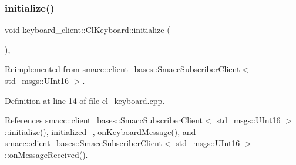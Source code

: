 \subsubsection{\texorpdfstring{initialize()}{initialize()}}
{\footnotesize\ttfamily void keyboard\+\_\+client\+::\+Cl\+Keyboard\+::initialize (\begin{DoxyParamCaption}{ }\end{DoxyParamCaption})\hspace{0.3cm}{\ttfamily [override]}, {\ttfamily [virtual]}}



Reimplemented from \hyperlink{classsmacc_1_1client__bases_1_1SmaccSubscriberClient_af188f0f5e89de26a07e1f964cdd23a70}{smacc\+::client\+\_\+bases\+::\+Smacc\+Subscriber\+Client$<$ std\+\_\+msgs\+::\+U\+Int16 $>$}.



Definition at line 14 of file cl\+\_\+keyboard.\+cpp.



References smacc\+::client\+\_\+bases\+::\+Smacc\+Subscriber\+Client$<$ std\+\_\+msgs\+::\+U\+Int16 $>$\+::initialize(), initialized\+\_\+, on\+Keyboard\+Message(), and smacc\+::client\+\_\+bases\+::\+Smacc\+Subscriber\+Client$<$ std\+\_\+msgs\+::\+U\+Int16 $>$\+::on\+Message\+Received().



